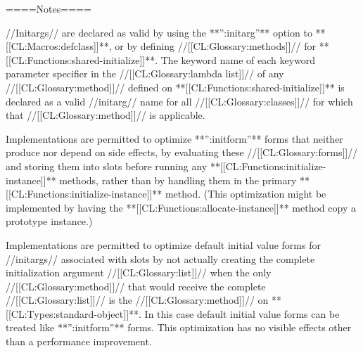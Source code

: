 ====Notes====

//Initargs// are declared as valid by using the **'':initarg''** option to **[[CL:Macros:defclass]]**, or by defining //[[CL:Glossary:methods]]// for **[[CL:Functions:shared-initialize]]**. The keyword name of each keyword parameter specifier in the //[[CL:Glossary:lambda list]]// of any //[[CL:Glossary:method]]// defined on **[[CL:Functions:shared-initialize]]** is declared as a valid //initarg// name for all //[[CL:Glossary:classes]]// for which that //[[CL:Glossary:method]]// is applicable.

Implementations are permitted to optimize **'':initform''** forms that neither produce nor depend on side effects, by evaluating these //[[CL:Glossary:forms]]// and storing them into slots before running any **[[CL:Functions:initialize-instance]]** methods, rather than by handling them in the primary **[[CL:Functions:initialize-instance]]** method. (This optimization might be implemented by having the **[[CL:Functions:allocate-instance]]** method copy a prototype instance.)

Implementations are permitted to optimize default initial value forms for //initargs// associated with slots by not actually creating the complete initialization argument //[[CL:Glossary:list]]// when the only //[[CL:Glossary:method]]// that would receive the complete //[[CL:Glossary:list]]// is the //[[CL:Glossary:method]]// on **[[CL:Types:standard-object]]**. In this case default initial value forms can be treated like **'':initform''** forms. This optimization has no visible effects other than a performance improvement.


